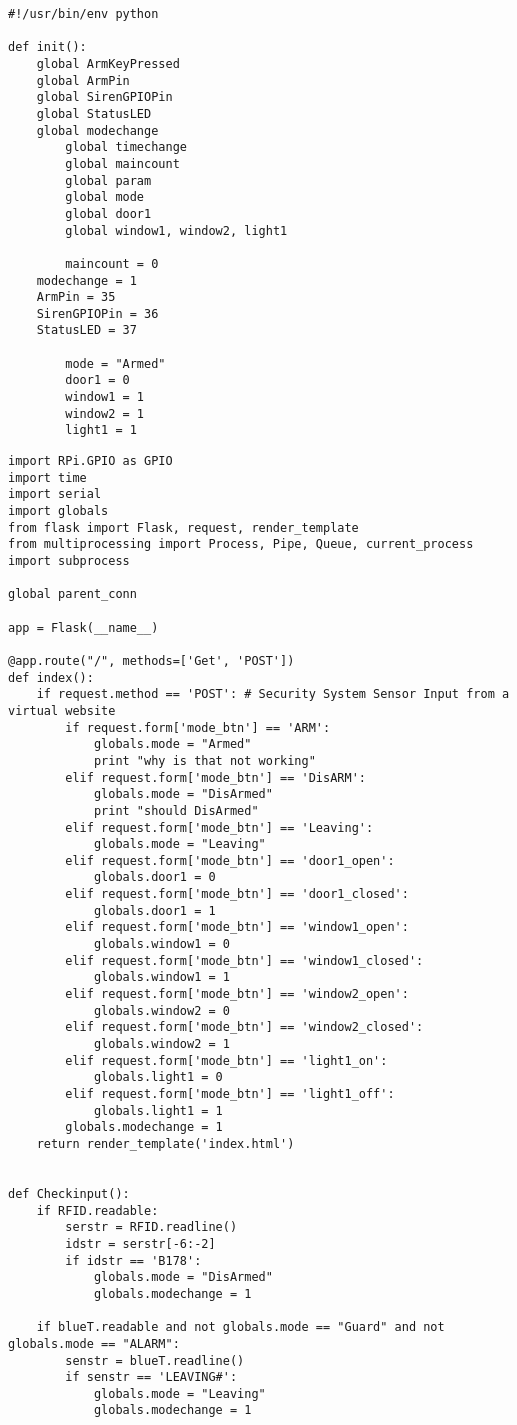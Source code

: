 \begin{verbatim}
#!/usr/bin/env python

def init():
	global ArmKeyPressed
	global ArmPin
	global SirenGPIOPin
	global StatusLED
	global modechange
        global timechange
        global maincount
        global param
        global mode
        global door1
        global window1, window2, light1

        maincount = 0
	modechange = 1
	ArmPin = 35
	SirenGPIOPin = 36
	StatusLED = 37

        mode = "Armed"
        door1 = 0
        window1 = 1
        window2 = 1
        light1 = 1
\end{verbatim}
        
\begin{verbatim}
import RPi.GPIO as GPIO
import time
import serial
import globals
from flask import Flask, request, render_template
from multiprocessing import Process, Pipe, Queue, current_process
import subprocess

global parent_conn

app = Flask(__name__)

@app.route("/", methods=['Get', 'POST'])
def index():
	if request.method == 'POST': # Security System Sensor Input from a virtual website
		if request.form['mode_btn'] == 'ARM':
			globals.mode = "Armed"
			print "why is that not working"
		elif request.form['mode_btn'] == 'DisARM':
			globals.mode = "DisArmed"
			print "should DisArmed"
		elif request.form['mode_btn'] == 'Leaving':
			globals.mode = "Leaving"
		elif request.form['mode_btn'] == 'door1_open':
			globals.door1 = 0
		elif request.form['mode_btn'] == 'door1_closed':	
			globals.door1 = 1
		elif request.form['mode_btn'] == 'window1_open':
			globals.window1 = 0
		elif request.form['mode_btn'] == 'window1_closed':	
			globals.window1 = 1
		elif request.form['mode_btn'] == 'window2_open':
			globals.window2 = 0
		elif request.form['mode_btn'] == 'window2_closed':	
			globals.window2 = 1
		elif request.form['mode_btn'] == 'light1_on':
			globals.light1 = 0
		elif request.form['mode_btn'] == 'light1_off':
			globals.light1 = 1
		globals.modechange = 1
	return render_template('index.html')


def Checkinput():	
	if RFID.readable:
		serstr = RFID.readline()
		idstr = serstr[-6:-2]
		if idstr == 'B178':
			globals.mode = "DisArmed"
			globals.modechange = 1
	
	if blueT.readable and not globals.mode == "Guard" and not globals.mode == "ALARM":
		senstr = blueT.readline()
		if senstr == 'LEAVING#':
			globals.mode = "Leaving"
			globals.modechange = 1			


\end{verbatim}
